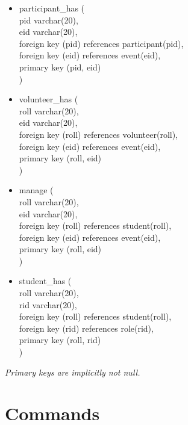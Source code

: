 \documentclass[7pt]{article}
\begin{document}
\begin{itemize}
    \item participant\_has (     \\
    pid varchar(20),        \\
    eid varchar(20),        \\
    foreign key (pid) references participant(pid),      \\
    foreign key (eid) references event(eid),     \\
    primary key (pid, eid)  \\
    )

    \item volunteer\_has (   \\
    roll varchar(20),   \\
    eid varchar(20),        \\
    foreign key (roll) references volunteer(roll),  \\
    foreign key (eid) references event(eid),        \\
    primary key (roll, eid) \\
    )  

    \item manage (     \\
    roll varchar(20),   \\
    eid varchar(20),    \\
    foreign key (roll) references student(roll),    \\
    foreign key (eid) references event(eid), \\
    primary key (roll, eid) \\
    )

    \item student\_has (     \\
    roll varchar(20),   \\
    rid varchar(20),        \\
    foreign key (roll) references student(roll),    \\
    foreign key (rid) references role(rid),      \\
    primary key (roll, rid) \\
    )
\end{itemize}

\begin{flushleft}
    \textit{Primary keys are implicitly not null.}
\end{flushleft}

\newpage

\section{\Large{Commands}}
\end{document}
